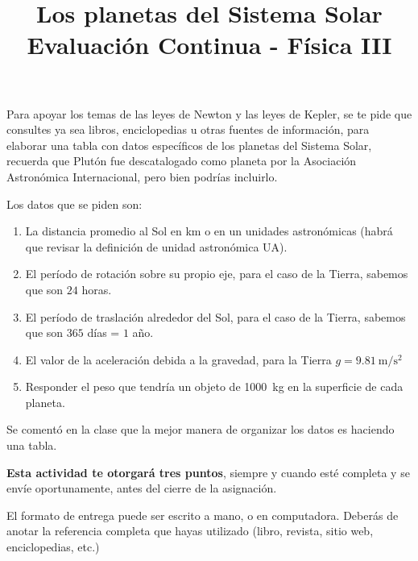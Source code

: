 \documentclass[14pt]{extarticle}
\title{\vspace*{-2cm} Los planetas del Sistema Solar \\  Evaluación Continua - Física III\vspace{-5ex}}
\date{}
\begin{document}
\maketitle

Para apoyar los temas de las leyes de Newton y las leyes de Kepler, se te pide que consultes ya sea libros, enciclopedias u otras fuentes de información, para elaborar una tabla con datos específicos de los planetas del Sistema Solar, recuerda que Plutón fue descatalogado como planeta por la Asociación Astronómica Internacional, pero bien podrías incluirlo.

\vspace*{0.5cm}
Los datos que se piden son:
\begin{enumerate}
\item La distancia promedio al Sol en \unit{\kilo\meter} o en un unidades astronómicas (habrá que revisar la definición de unidad astronómica UA).
\item El período de rotación sobre su propio eje, para el caso de la Tierra, sabemos que son $24$ horas.
\item El período de traslación alrededor del Sol, para el caso de la Tierra, sabemos que son $365$ días = $1$ año.
\item El valor de la aceleración debida a la gravedad, para la Tierra $g = \SI{9.81}{\meter\per\square\second}$
\item Responder el peso que tendría un objeto de \SI{1000}{\kilo\gram} en la superficie de cada planeta.
\end{enumerate}
Se comentó en la clase que la mejor manera de organizar los datos es haciendo una tabla.

\vspace*{0.5cm}
\textbf{Esta actividad te otorgará tres puntos}, siempre y cuando esté completa y se envíe oportunamente, antes del cierre de la asignación.

\vspace*{0.5cm}
El formato de entrega puede ser escrito a mano, o en computadora. Deberás de anotar la referencia completa que hayas utilizado (libro, revista, sitio web, enciclopedias, etc.)
\end{document}
